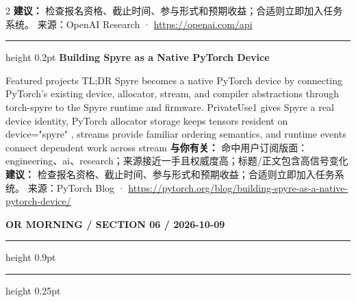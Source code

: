 \documentclass[10.5pt]{ctexart}
\begin{document}
\begin{multicols}{2}
\textbf{建议：} 检查报名资格、截止时间、参与形式和预期收益；合适则立即加入任务系统。
{\footnotesize\color{ormuted} 来源：OpenAI Research · \url{https://openai.com/api}}
\vspace{2mm}
\hrule height 0.2pt
\vspace{2mm}
{\large\bfseries Building Spyre as a Native PyTorch Device}\par
Featured projects TL;DR Spyre becomes a native PyTorch device by connecting PyTorch’s existing device, allocator, stream, and compiler abstractions through torch-spyre to the Spyre runtime and firmware. PrivateUse1 gives Spyre a real device identity, PyTorch allocator storage keeps tensors resident on device="spyre" , streams provide familiar ordering semantics, and runtime events connect dependent work across stream
\textbf{与你有关：} 命中用户订阅版面：engineering、ai、research；来源接近一手且权威度高；标题/正文包含高信号变化
\textbf{建议：} 检查报名资格、截止时间、参与形式和预期收益；合适则立即加入任务系统。
{\footnotesize\color{ormuted} 来源：PyTorch Blog · \url{https://pytorch.org/blog/building-spyre-as-a-native-pytorch-device/}}
\end{multicols}
\newpage
{\small\bfseries OR MORNING / SECTION 06 / 2026-10-09}
\vspace{2mm}
\hrule height 0.9pt
\vspace{1.5mm}
\hrule height 0.25pt
\vspace{4mm}
\end{document}
